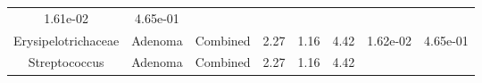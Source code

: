 \documentclass[12pt,]{article}
\begin{document}
\begin{longtable}[]{@{}cccccccc@{}}
\begin{minipage}[t]{0.06\columnwidth}
1.61e-02\strut
\end{minipage} & \begin{minipage}[t]{0.06\columnwidth}\centering\strut
4.65e-01\strut
\end{minipage}\tabularnewline
\begin{minipage}[t]{0.18\columnwidth}\centering\strut
Erysipelotrichaceae\strut
\end{minipage} & \begin{minipage}[t]{0.07\columnwidth}\centering\strut
Adenoma\strut
\end{minipage} & \begin{minipage}[t]{0.09\columnwidth}\centering\strut
Combined\strut
\end{minipage} & \begin{minipage}[t]{0.03\columnwidth}\centering\strut
2.27\strut
\end{minipage} & \begin{minipage}[t]{0.14\columnwidth}\centering\strut
1.16\strut
\end{minipage} & \begin{minipage}[t]{0.14\columnwidth}\centering\strut
4.42\strut
\end{minipage} & \begin{minipage}[t]{0.06\columnwidth}\centering\strut
1.62e-02\strut
\end{minipage} & \begin{minipage}[t]{0.06\columnwidth}\centering\strut
4.65e-01\strut
\end{minipage}\tabularnewline
\begin{minipage}[t]{0.18\columnwidth}\centering\strut
Streptococcus\strut
\end{minipage} & \begin{minipage}[t]{0.07\columnwidth}\centering\strut
Adenoma\strut
\end{minipage} & \begin{minipage}[t]{0.09\columnwidth}\centering\strut
Combined\strut
\end{minipage} & \begin{minipage}[t]{0.03\columnwidth}\centering\strut
2.27\strut
\end{minipage} & \begin{minipage}[t]{0.14\columnwidth}\centering\strut
1.16\strut
\end{minipage} & \begin{minipage}[t]{0.14\columnwidth}\centering\strut
4.42\strut
\end{minipage} & \begin{minipage}[t]{0.06\columnwidth}\centering\strut

\end{minipage}
\end{longtable}
\end{document}
